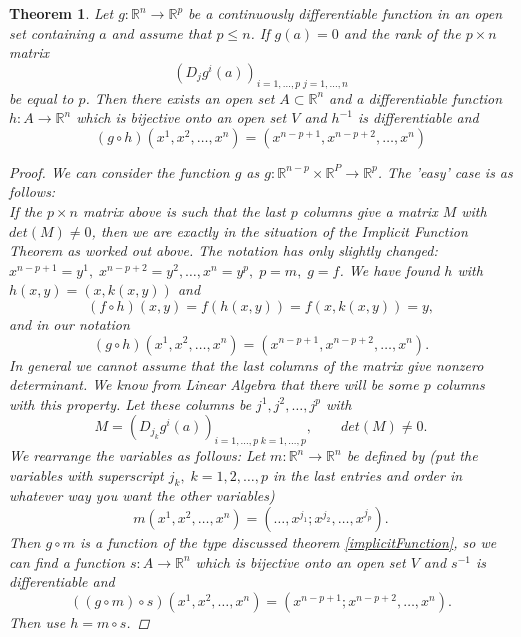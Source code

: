 \documentclass[11pt]{article}
\def\RR{\mathbb{R}}
\newtheorem{theorem}{Theorem}[section]
\begin{document}
\begin{theorem}\label{imp2}
Let $g : \RR^n \rightarrow \RR^p$ be a continuously differentiable function in an open set containing $a$ and assume that $p \leq n$. If $g(a) = 0$ and the rank of the $p \times n$ matrix
\[(D_jg^i(a))_{i=1,\dots,p \; j=1,\dots, n} \]
be equal to $p$. Then there exists an open set $A \subset \RR^n$ and a differentiable function $h : A \rightarrow \RR^n$ which is bijective onto an open set $V$ and $h^{-1}$ is differentiable and
\[(g \circ h)(x^1, x^2, \dots,x^n) = (x^{n-p+1}, x^{n - p+2}, \dots,x^n) \]
\begin{proof}
We can consider the function $g$ as $g : \RR^{n-p} \times \RR^P \rightarrow \RR^p$. The 'easy' case is as follows:\\
If the $p\times n$ matrix above is such that the last $p$ columns give a matrix $M$ with $det(M) \neq
0$, then we are exactly in the situation of the Implicit Function Theorem as worked out
above. The notation has only slightly changed: $x^{n-p+1} = y^1,\; x^{n-p+2} = y^2, \dots,x^n = y^p, \;
p = m,\; g = f$. We have found $h$ with $h(x, y) = (x, k(x, y))$ and 
\[(f \circ h)(x, y) = f(h(x, y)) = f(x, k(x, y)) = y,\]
and in our notation
\[(g \circ h)(x^1, x^2, \dots,  x^n) = (x^{n-p+1}, x^{n-p+2}, \dots, x^n).\]
In general we cannot assume that the last columns of the matrix give nonzero determinant. We know from Linear Algebra that there will be some $p$ columns with this property. Let these columns be $j^1, j^2, \dots, j^p$ with
\[M =(D_{j_k}g^i(a))_{i=1,\dots,p \; k=1,\dots ,p}, \qquad det(M) \neq 0.\]
We rearrange the variables as follows: Let $m : \RR^n \rightarrow \RR^n$ be defined by (put the variables
with superscript $j_k,\; k = 1, 2,\dots, p$ in the last entries and order in whatever way you want
the other variables)
\[m(x^1, x^2, \dots ,x^n) = (\dots, x^{j_1} ; x^{j_2},\dots, x^{j_p}).\]
Then $g \circ m$ is a function of the type discussed theorem \ref{implicitFunction}, so we can find a function $s : A \rightarrow \RR^n$
which is bijective onto an open set $V$ and $s^{-1}$ is differentiable and
\[ ((g \circ m) \circ s)(x^1, x^2, \dots, x^n) = (x^{n-p+1}; x^{n-p+2} , \dots,  x^n).\]
Then use $h = m \circ s$.
\end{proof}
\end{theorem}
\end{document}
